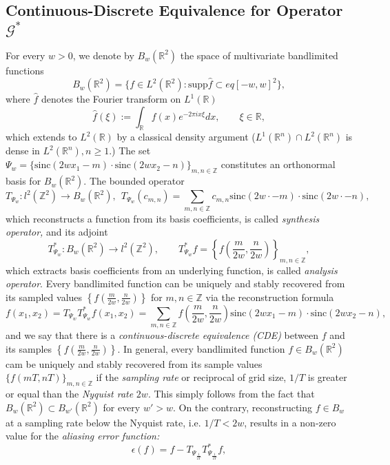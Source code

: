 \documentclass[reqno,10pt]{amsart}
\theoremstyle{plain}
\newcommand{\sinc}{\text{sinc}}
\theoremstyle{definition}
\newcommand{\bb}[1]{\mathbb{#1}}
\newcommand{\cal}[1]{\mathcal{#1}}
\begin{document}
    \subsection{Continuous-Discrete Equivalence for Operator \texorpdfstring{$\cal G^*$}{}} \label{appendix:A.2}
    For every $w > 0$, we denote by $B_w(\bb R^2)$ the space of multivariate bandlimited functions
    $$B_w(\bb R^2) = \{f \in L^2(\bb R^2) : \text{supp}\hat{f} \subset eq [-w,w]^2\},$$
    where $\hat{f}$ denotes the Fourier transform on $L^1(\bb R)$ 
    $$ \hat{f}(\xi) := \int_{\bb R}f(x) e^{-2\pi ix\xi} dx, \qquad \xi \in \bb R,$$
    which extends to $L^2(\bb R)$ by a classical density argument ($L^1(\bb R^n) \cap L^2(\bb R^n)$ is dense in $L^2(\bb R^n), n \geq 1$.) The set $\Psi_w = \{\sinc(2wx_1 - m) \cdot \sinc(2wx_2 - n)\}_{m,n \in \bb Z}$ constitutes an orthonormal basis for $B_w(\bb R^2)$. The bounded operator
    $$ T_{\Psi_w} :l^2(\bb Z^2) \to B_w(\bb R^2), ~~ T_{\Psi_w}(c_{m,n}) = \sum_{m,n\in \bb Z} c_{m,n} \sinc(2w\cdot - m)\cdot \sinc(2w\cdot -n),$$
    which reconstructs a function from its basis coefficients, is called {\it synthesis operator,} and its adjoint 
    $$ T^*_{\Psi_w} : B_w(\bb R^2) \to l^2(\bb Z^2), \qquad T^*_{\Psi_w} f = \left\{f\left(\frac{m}{2w},\frac{n}{2w}\right)\right\}_{m,n \in \bb Z},$$
    which extracts basis coefficients from an underlying function, is called {\it analysis operator}.  Every bandlimited function can be uniquely and stably recovered from its sampled values $\left\{f\left(\frac{m}{2w},\frac{n}{2w}\right)\right\}$ for ${m,n \in \bb Z}$ via the reconstruction formula
    \begin{equation}
        f(x_1,x_2) = T_{\Psi_w}T^*_{\Psi_w}f(x_1,x_2) = \sum\limits_{m,n \in \bb Z} f\left(\frac{m}{2w},\frac{n}{2w}\right) \sinc(2wx_1 - m) \cdot \sinc(2wx_2 - n),
    \end{equation}
    and we say that there is a {\it continuous-discrete equivalence (CDE)} between $f$ and its samples $\left\{f\left(\frac{m}{2w},\frac{n}{2w}\right)\right\}$. In general, every bandlimited function $f \in B_w(\bb R^2)$ cam be uniquely and stably recovered from its sample values $\{f(mT,nT)\}_{m,n\in\bb Z}$ if the {\it sampling rate} or reciprocal of grid size, $1/T$ is greater or equal than the {\it Nyquist rate} $2w$. This simply follows from the fact that $B_w(\bb R^2) \subset B_{w'}(\bb R^2)$ for every $w' > w$. On the contrary, reconstructing $f \in B_w$ at a sampling rate below the Nyquist rate, i.e. $1/T < 2w$, results in a non-zero value for the {\it aliasing error function:}
    $$ \epsilon(f) = f - T_{{\Psi}_{\frac{1}{2T}}} T^*_{{\Psi}_{\frac{1}{2T}}}f,$$
\end{document}
